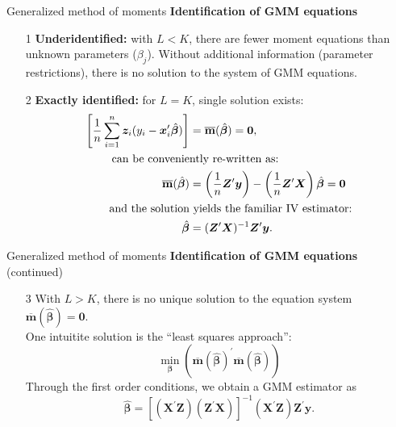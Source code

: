 \documentclass{beamer}
\begin{document}
\begin{frame}{Generalized method of moments}
\textbf{Identification of GMM equations}
\bigskip
\begin{itemize}
    \item[1] \textbf{Underidentified:} with $L < K$, there are fewer moment equations than unknown parameters ($\beta_j$). Without additional information (parameter restrictions), there is no solution to the system of GMM equations.
    \bigskip
    \item[2] \textbf{Exactly identified:} for $L = K$, single solution exists:  
    \begin{equation*}
        \begin{aligned}
        \left[ \frac{1}{n} \sum_{i=1}^n \bm{z}_i (y_i - \bm{x}_i^{\prime}\hat{\bm{\beta}}) \right]
&= \overline{\mathbf{m}}(\hat{\bm{\beta}}) = \bm{0},\\
\textnormal{can be convenie} & \textnormal{ntly~re-written as:}\\
\overline{\mathbf{m}}(\hat{\bm{\beta}}) &= \left( \frac{1}{n} \bm{Z}^{\prime} \bm{y} \right) - \left( \frac{1}{n} \bm{Z}^{\prime} \bm{X} \right) \hat{\bm{\beta}} = \bm{0}\\
\textnormal{and the solution} & \textnormal{~yields the familiar IV estimator:}\\
\hat{\bm{\beta}} &=     (\bm{Z}^{\prime}\bm{X})^{-1} \bm{Z}^{\prime}\bm{y}.
        \end{aligned}
    \end{equation*}
\end{itemize}
\end{frame}
\begin{frame}{Generalized method of moments}
\textbf{Identification of GMM equations} (continued)
\bigskip
\begin{itemize}
    \item[3] With $L > K$, there is no unique solution to the equation system $\overline{\mathbf{m}}(\hat{\bm{\beta}}) = \bm{0}$. \\
    \medskip
    One intuitite solution is the ``least squares approach'':
    $$\underset{\bm{\beta}}{\min}\left(  \overline{\mathbf{m}}(\hat{\bm{\beta}})^{\prime} \overline{\mathbf{m}}(\hat{\bm{\beta}})  \right)$$
    Through the first order conditions, we obtain a GMM estimator as
    $$
    \hat{\bm{\beta}} =\left[ (\bm{X}^{\prime}\bm{Z}) (\bm{Z}^{\prime}\bm{X}) \right]^{-1} (\bm{X}^{\prime}\bm{Z}) \bm{Z}^{\prime}\bm{y}.
    $$
\end{itemize}
\end{frame}
\end{document}
